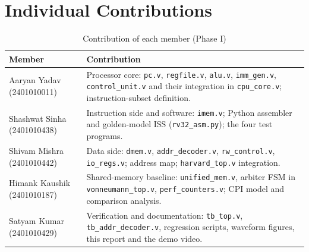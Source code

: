 \documentclass[conference]{IEEEtran}
\begin{document}
\section{Individual Contributions}
\begin{table}[h]
\caption{Contribution of each member (Phase I)}
\label{tab:contrib}
\centering
\renewcommand{\arraystretch}{1.15}
\begin{tabular}{p{}p{}}
\toprule
Member & Contribution \\
\midrule
Aaryan Yadav (2401010011) & Processor core: \texttt{pc.v}, \texttt{regfile.v}, \texttt{alu.v}, \texttt{imm\_gen.v}, \texttt{control\_unit.v} and their integration in \texttt{cpu\_core.v}; instruction-subset definition. \\
Shashwat Sinha (2401010438) & Instruction side and software: \texttt{imem.v}; Python assembler and golden-model ISS (\texttt{rv32\_asm.py}); the four test programs. \\
Shivam Mishra (2401010442) & Data side: \texttt{dmem.v}, \texttt{addr\_decoder.v}, \texttt{rw\_control.v}, \texttt{io\_regs.v}; address map; \texttt{harvard\_top.v} integration. \\
Himank Kaushik (2401010187) & Shared-memory baseline: \texttt{unified\_mem.v}, arbiter FSM in \texttt{vonneumann\_top.v}, \texttt{perf\_counters.v}; CPI model and comparison analysis. \\
Satyam Kumar (2401010429) & Verification and documentation: \texttt{tb\_top.v}, \texttt{tb\_addr\_decoder.v}, regression scripts, waveform figures, this report and the demo video. \\
\bottomrule
\end{tabular}
\end{table}
\end{document}
